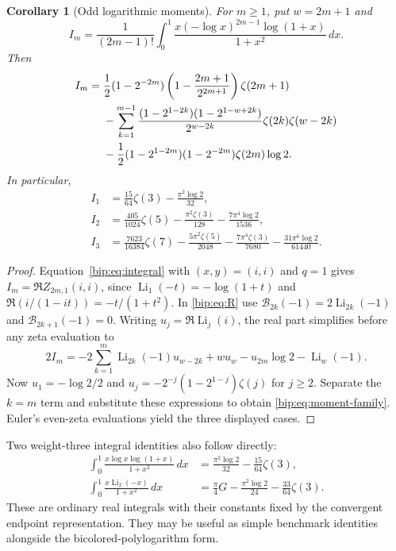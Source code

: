 \documentclass[11pt,a4paper]{article}
\numberwithin{equation}{section}
\newtheorem{corollary}[theorem]{Corollary}
\theoremstyle{definition}
\theoremstyle{remark}
\DeclareMathOperator{\Li}{Li}
\begin{document}
\begin{corollary}[Odd logarithmic moments]
For $m\ge1$, put $w=2m+1$ and
\[
 I_m=\frac1{(2m-1)!}\int_0^1
       \frac{x(-\log x)^{2m-1}\log(1+x)}{1+x^2}\,dx.
\]
Then
\begin{align}
 I_m={}&\frac12(1-2^{-2m})
        \left(1-\frac{2m+1}{2^{2m+1}}\right)\zeta(2m+1)\notag\\
 &-\sum_{k=1}^{m-1}
  \frac{(1-2^{1-2k})(1-2^{1-w+2k})}{2^{w-2k}}
       \zeta(2k)\zeta(w-2k)\notag\\
 &-\frac12(1-2^{1-2m})(1-2^{-2m})\zeta(2m)\log2.
 \label{bip:eq:moment-family}
\end{align}
In particular,
\begin{align*}
 I_1&=\frac{15}{64}\zeta(3)-\frac{\pi^2\log2}{32},\\
 I_2&=\frac{405}{1024}\zeta(5)-\frac{\pi^2\zeta(3)}{128}
                     -\frac{7\pi^4\log2}{1536},\\
 I_3&=\frac{7623}{16384}\zeta(7)-\frac{5\pi^2\zeta(5)}{2048}
       -\frac{7\pi^4\zeta(3)}{7680}-\frac{31\pi^6\log2}{61440}.
\end{align*}
\end{corollary}
\begin{proof}
Equation~\eqref{bip:eq:integral} with $(x,y)=(i,i)$ and $q=1$
gives $I_m=\Re Z_{2m,1}(i,i)$, since
$\Li_1(-t)=-\log(1+t)$ and $\Re(i/(1-it))=-t/(1+t^2)$.
In \eqref{bip:eq:R} use
$\mathcal B_{2k}(-1)=2\Li_{2k}(-1)$ and
$\mathcal B_{2k+1}(-1)=0$. Writing
$u_j=\Re\Li_j(i)$, the real part simplifies before any
zeta evaluation to
\[
 2I_m=-2\sum_{k=1}^{m}\Li_{2k}(-1)u_{w-2k}
           +w u_w-u_{2m}\log2-\Li_w(-1).
\]
Now $u_1=-\log2/2$ and
$u_j=-2^{-j}(1-2^{1-j})\zeta(j)$ for $j\ge2$.
Separate the $k=m$ term and substitute these expressions to obtain
\eqref{bip:eq:moment-family}.  Euler's even-zeta evaluations yield
the three displayed cases.
\end{proof}

Two weight-three integral identities also follow directly:
\begin{align*}
 \int_0^1\frac{x\log x\log(1+x)}{1+x^2}\,dx
  &=\frac{\pi^2\log2}{32}-\frac{15}{64}\zeta(3),\\
 \int_0^1\frac{x\Li_2(-x)}{1+x^2}\,dx
  &=\frac\pi4G-\frac{\pi^2\log2}{24}-\frac{33}{64}\zeta(3).
\end{align*}
These are ordinary real integrals with their constants fixed by the
convergent endpoint representation. They may be useful as simple
benchmark identities alongside the bicolored-polylogarithm form.
\end{document}
